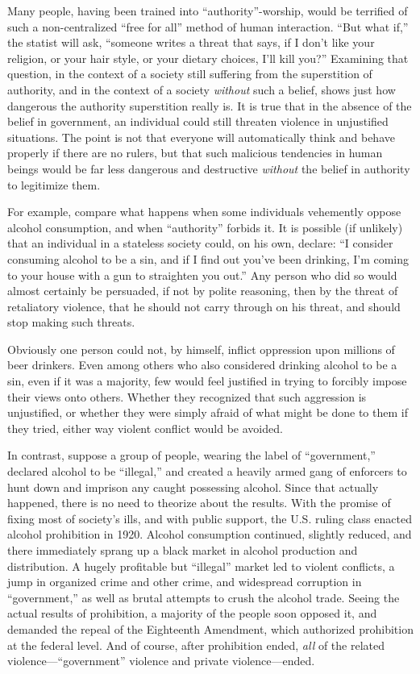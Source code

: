 \documentclass{book}
\begin{document}
Many people, having been trained into \enquote{authority}-worship, would be terrified of such a non-centralized \enquote{free for all} method of human interaction. \enquote{But what if,} the statist will ask, \enquote{someone writes a threat that says, if I don't like your religion, or your hair style, or your dietary choices, I'll kill you?} Examining that question, in the context of a society still suffering from the superstition of authority, and in the context of a society \emph{without} such a belief, shows just how dangerous the authority superstition really is. It is true that in the absence of the belief in government, an individual could still threaten violence in unjustified situations. The point is not that everyone will automatically think and behave properly if there are no rulers, but that such malicious tendencies in human beings would be far less dangerous and destructive \emph{without} the belief in authority to legitimize them.

For example, compare what happens when some individuals vehemently oppose alcohol consumption, and when \enquote{authority} forbids it. It is possible (if unlikely) that an individual in a stateless society could, on his own, declare: \enquote{I consider consuming alcohol to be a sin, and if I find out you've been drinking, I'm coming to your house with a gun to straighten you out.} Any person who did so would almost certainly be persuaded, if not by polite reasoning, then by the threat of retaliatory violence, that he should not carry through on his threat, and should stop making such threats.

Obviously one person could not, by himself, inflict oppression upon millions of beer drinkers. Even among others who also considered drinking alcohol to be a sin, even if it was a majority, few would feel justified in trying to forcibly impose their views onto others. Whether they recognized that such aggression is unjustified, or whether they were simply afraid of what might be done to them if they tried, either way violent conflict would be avoided.

In contrast, suppose a group of people, wearing the label of \enquote{government,} declared alcohol to be \enquote{illegal,} and created a heavily armed gang of enforcers to hunt down and imprison any caught possessing alcohol. Since that actually happened, there is no need to theorize about the results. With the promise of fixing most of society's ills, and with public support, the U.S. ruling class enacted alcohol prohibition in 1920. Alcohol consumption continued, slightly reduced, and there immediately sprang up a black market in alcohol production and distribution. A hugely profitable but \enquote{illegal} market led to violent conflicts, a jump in organized crime and other crime, and widespread corruption in \enquote{government,} as well as brutal attempts to crush the alcohol trade. Seeing the actual results of prohibition, a majority of the people soon opposed it, and demanded the repeal of the Eighteenth Amendment, which authorized prohibition at the federal level. And of course, after prohibition ended, \emph{all} of the related violence---\enquote{government} violence and private violence---ended.
\end{document}
